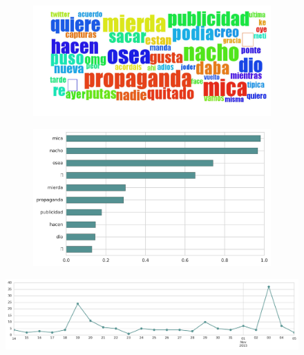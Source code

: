\begin{figure}[htbp!]
    \centering
    \begin{subfigure}[b]{0.49\textwidth}
        \includegraphics[width=\textwidth]{twitter_all/report_images/topic-36-wordcloud.jpg}
    \end{subfigure}
    \begin{subfigure}[b]{0.49\textwidth}
        \includegraphics[width=\textwidth]{twitter_all/report_images/topic-36-terms.jpg}
    \end{subfigure}
\end{figure}

\begin{figure}[htbp!]
    \centering
    \includegraphics[width=\textwidth]{twitter_all/report_images/topic-36-timeseries.jpg}
\end{figure}

